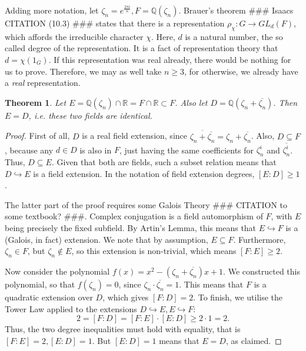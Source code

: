 \documentclass[11pt]{article}
\newtheorem{theorem}{Theorem}[section]
\begin{document}
Adding more notation, let $\zeta_n = e^{\frac{2\pi i}{n}}, F=\mathbb{Q}(\zeta_n)$.
Brauer's theorem \#\#\# Isaacs CITATION (10.3) \#\#\# states that there is a
representation $\rho_\chi: G \rightarrow GL_d(F)$, which affords the irreducible character $\chi$.
Here, $d$ is a natural number, the so called degree of the representation.
It is a fact of representation theory that $d = \chi(1_G)$.
If this representation was real already, there would be nothing for us to prove. Therefore, we may
as well take $n \geq 3$, for otherwise, we already have a \textit{real} representation.

\begin{theorem}
  Let $E = \mathbb{Q}(\zeta_n) \cap \mathbb{R} = F \cap \mathbb{R} \subset F$.
  Also let $D = \mathbb{Q}(\zeta_n + \overline{\zeta_n})$.
  Then $E = D$, i.e. these two fields are identical.
\end{theorem}
\begin{proof}
  First of all, $D$ is a real field extension, since $\overline{\zeta_n + \overline{\zeta_n}} = \zeta_n + \overline{\zeta_n}$.
  Also, $D \subseteq F$, because any $d \in D$ is also in $F$, just having the same coefficients for $\zeta_n^i$ and $\overline{\zeta_n^i}$.
  Thus, $D \subseteq E$. Given that both are fields, such a subset relation means that $D \hookrightarrow E$ is a field extension.
  In the notation of field extension degrees, $[E:D] \geq 1$.

  The latter part of the proof requires some Galois Theory \#\#\# CITATION to some textbook? \#\#\#.
  Complex conjugation is a field automorphism of $F$, with $E$ being precisely the fixed subfield.
  By Artin's Lemma, this means that $E \hookrightarrow F$ is a (Galois, in fact) extension.
  We note that by assumption, $E \subseteq F$. Furthermore, $\zeta_n \in F$, but $\zeta_n \notin E$,
  so this extension is non-trivial, which means $[F:E] \geq 2$.

  Now consider the polynomial $f(x) = x^2 - (\zeta_n + \overline{\zeta_n})x + 1$. We constructed this
  polynomial, so that $f(\zeta_n) = 0$, since $\zeta_n \cdot \overline{\zeta_n} = 1$. This means
  that $F$ is a quadratic extension over $D$, which gives $[F:D] = 2$. To finish, we utilise the Tower Law
  applied to the extensions $D \hookrightarrow E, E \hookrightarrow F$:
  \[2 = [F:D] = [F:E] \cdot [E:D] \geq 2 \cdot 1 = 2.\]
  Thus, the two degree inequalities must hold with equality, that is $[F:E] = 2, [E:D] = 1$.
  But $[E:D] = 1$ means that $E = D$, as claimed.
\end{proof}
\end{document}
